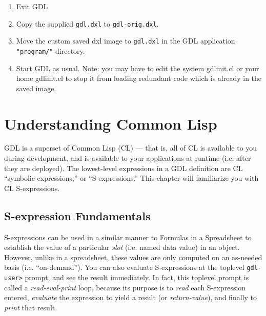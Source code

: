 \documentclass [11pt]{book}
\begin{document}
\begin{enumerate}

\item Exit GDL

\item Copy the supplied \texttt{gdl.dxl} to \texttt{gdl-orig.dxl}.

\item Move the custom saved dxl image to \texttt{gdl.dxl} in the GDL application \texttt{"program/"} directory.

\item Start GDL as usual. Note: you may have to edit the system gdlinit.cl or your home gdlinit.cl
to stop it from loading redundant code which is already in the saved image.

\end{enumerate}



\chapter{Understanding Common Lisp}

\label{chap:understandingcommonlisp}



GDL is a superset of Common Lisp (CL) --- that is, all of
CL is available to you during development, and is available to your
applications at runtime (i.e. after they are deployed). The
lowest-level expressions in a GDL definition are CL ``symbolic
expressions,'' or ``S-expressions.''  This chapter will familiarize
you with CL S-expressions.



\section{S-expression Fundamentals}

\label{sec:s-expressionfundamentals}



S-expressions can be used in a similar manner to Formulas
in a Spreadsheet to establish the value of a particular \emph{slot} (i.e. named data value) in an object. However, unlike in
a spreadsheet, these values are only computed on an as-needed
basis (i.e. ``on-demand''). You can also evaluate S-expressions at the
toplevel \texttt{gdl-user\textgreater} prompt, and see the result immediately. In fact, this toplevel prompt is called a \emph{read-eval-print} loop, because its purpose is to \emph{read} each S-expression  entered, \emph{evaluate} the expression to yield a result (or \emph{return-value}), and finally to \emph{print} that result.
\end{document}
